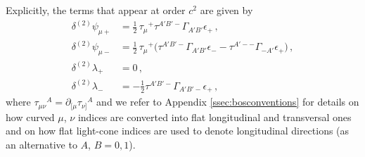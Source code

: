 \documentclass[a4paper,10pt,openany]{article}
\begin{document}
	Explicitly, the terms that appear at order $c^2$ are given by
	\begin{subequations}\label{eq:divsupersymmetry}
		\begin{align}
			\delta^{(2)}\psi_{\mu + } &= \frac{1}{2}\,\tau_\mu{}^+\tau^{A'B'-}\Gamma_{A'B'}\epsilon_+\,,\\
			\delta^{(2)}\psi_{\mu - }  &= \frac{1}{2}\,\tau_\mu{}^+\big(\tau^{A'B'-}\Gamma_{A'B'}\epsilon_- - \tau^{A'--}\Gamma_{-A'}\epsilon_+ \big)\,,\\
			\delta^{(2)}\lambda_+ &= 0\,,\\
			\delta^{(2)}\lambda_- &= -\frac{1}{2}\tau^{A'B'-}\Gamma_{A'B'-}\epsilon_+ \,,
		\end{align}
	\end{subequations}
	where $\tau_{\mu\nu}{}^A = \partial_{[\mu} \tau_{\nu]}{}^A$ and we refer to Appendix \ref{ssec:bosconventions} for details on how curved $\mu$, $\nu$ indices are converted into flat longitudinal and transversal ones and on how flat light-cone indices are used to denote longitudinal directions (as an alternative to $A$, $B = 0,1$). %
	
\end{document}
